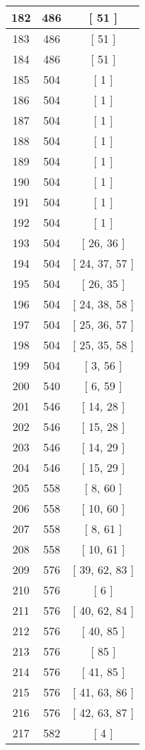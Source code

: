 \begin{center}
\begin{longtable}[H]{|| c c c ||}
\hline
182 & 486 & [ 51 ] \\ 
\hline
183 & 486 & [ 51 ] \\ 
\hline
184 & 486 & [ 51 ] \\ 
\hline
185 & 504 & [ 1 ] \\ 
\hline
186 & 504 & [ 1 ] \\ 
\hline
187 & 504 & [ 1 ] \\ 
\hline
188 & 504 & [ 1 ] \\ 
\hline
189 & 504 & [ 1 ] \\ 
\hline
190 & 504 & [ 1 ] \\ 
\hline
191 & 504 & [ 1 ] \\ 
\hline
192 & 504 & [ 1 ] \\ 
\hline
193 & 504 & [ 26, 36 ] \\ 
\hline
194 & 504 & [ 24, 37, 57 ] \\ 
\hline
195 & 504 & [ 26, 35 ] \\ 
\hline
196 & 504 & [ 24, 38, 58 ] \\ 
\hline
197 & 504 & [ 25, 36, 57 ] \\ 
\hline
198 & 504 & [ 25, 35, 58 ] \\ 
\hline
199 & 504 & [ 3, 56 ] \\ 
\hline
200 & 540 & [ 6, 59 ] \\ 
\hline
201 & 546 & [ 14, 28 ] \\ 
\hline
202 & 546 & [ 15, 28 ] \\ 
\hline
203 & 546 & [ 14, 29 ] \\ 
\hline
204 & 546 & [ 15, 29 ] \\ 
\hline
205 & 558 & [ 8, 60 ] \\ 
\hline
206 & 558 & [ 10, 60 ] \\ 
\hline
207 & 558 & [ 8, 61 ] \\ 
\hline
208 & 558 & [ 10, 61 ] \\ 
\hline
209 & 576 & [ 39, 62, 83 ] \\ 
\hline
210 & 576 & [ 6 ] \\ 
\hline
211 & 576 & [ 40, 62, 84 ] \\ 
\hline
212 & 576 & [ 40, 85 ] \\ 
\hline
213 & 576 & [ 85 ] \\ 
\hline
214 & 576 & [ 41, 85 ] \\ 
\hline
215 & 576 & [ 41, 63, 86 ] \\ 
\hline
216 & 576 & [ 42, 63, 87 ] \\ 
\hline
217 & 582 & [ 4 ] \\ 

\end{longtable}
\end{center}
